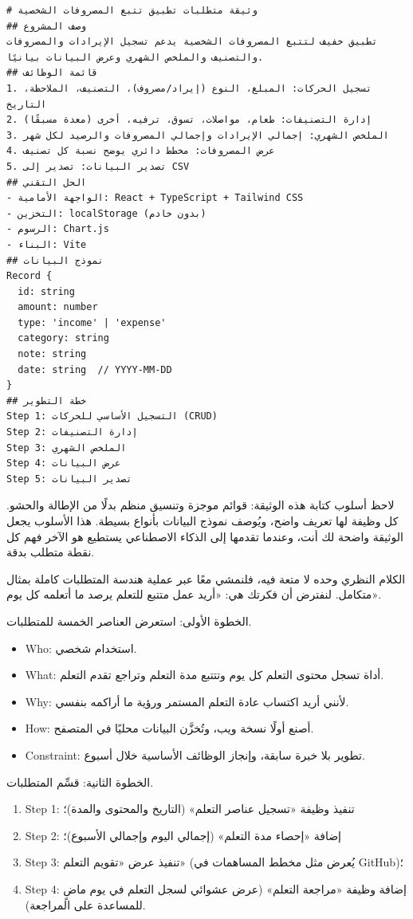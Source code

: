 \begin{lstlisting}
# وثيقة متطلبات تطبيق تتبع المصروفات الشخصية
## وصف المشروع
تطبيق خفيف لتتبع المصروفات الشخصية يدعم تسجيل الإيرادات والمصروفات والتصنيف والملخص الشهري وعرض البيانات بيانيًا.
## قائمة الوظائف
1. تسجيل الحركات: المبلغ، النوع (إيراد/مصروف)، التصنيف، الملاحظة، التاريخ
2. إدارة التصنيفات: طعام، مواصلات، تسوق، ترفيه، أخرى (معدة مسبقًا)
3. الملخص الشهري: إجمالي الإيرادات وإجمالي المصروفات والرصيد لكل شهر
4. عرض المصروفات: مخطط دائري يوضح نسبة كل تصنيف
5. تصدير البيانات: تصدير إلى CSV
## الحل التقني
- الواجهة الأمامية: React + TypeScript + Tailwind CSS
- التخزين: localStorage (بدون خادم)
- الرسوم: Chart.js
- البناء: Vite
## نموذج البيانات
Record {
  id: string
  amount: number
  type: 'income' | 'expense'
  category: string
  note: string
  date: string  // YYYY-MM-DD
}
## خطة التطوير
Step 1: التسجيل الأساسي للحركات (CRUD)
Step 2: إدارة التصنيفات
Step 3: الملخص الشهري
Step 4: عرض البيانات
Step 5: تصدير البيانات
\end{lstlisting}

لاحظ أسلوب كتابة هذه الوثيقة: قوائم موجزة وتنسيق منظم بدلًا من الإطالة والحشو. كل وظيفة لها تعريف واضح، ويُوصف نموذج البيانات بأنواع بسيطة. هذا الأسلوب يجعل الوثيقة واضحة لك أنت، وعندما تقدمها إلى الذكاء الاصطناعي يستطيع هو الآخر فهم كل نقطة متطلب بدقة.


الكلام النظري وحده لا متعة فيه، فلنمشي معًا عبر عملية هندسة المتطلبات كاملة بمثال متكامل. لنفترض أن فكرتك هي: «أريد عمل متتبع للتعلم يرصد ما أتعلمه كل يوم».

الخطوة الأولى: استعرض العناصر الخمسة للمتطلبات.

\begin{itemize}
  \item Who: استخدام شخصي.
  \item What: أداة تسجل محتوى التعلم كل يوم وتتتبع مدة التعلم وتراجع تقدم التعلم.
  \item Why: لأنني أريد اكتساب عادة التعلم المستمر ورؤية ما أراكمه بنفسي.
  \item How: أصنع أولًا نسخة ويب، وتُخزَّن البيانات محليًا في المتصفح.
  \item Constraint: تطوير بلا خبرة سابقة، وإنجاز الوظائف الأساسية خلال أسبوع.
\end{itemize}

الخطوة الثانية: قسِّم المتطلبات.

\begin{enumerate}
  \item Step 1: تنفيذ وظيفة «تسجيل عناصر التعلم» (التاريخ والمحتوى والمدة)؛
  \item Step 2: إضافة «إحصاء مدة التعلم» (إجمالي اليوم وإجمالي الأسبوع)؛
  \item Step 3: تنفيذ عرض «تقويم التعلم» (يُعرض مثل مخطط المساهمات في GitHub)؛
  \item Step 4: إضافة وظيفة «مراجعة التعلم» (عرض عشوائي لسجل التعلم في يوم ماضٍ للمساعدة على المراجعة).
\end{enumerate}

